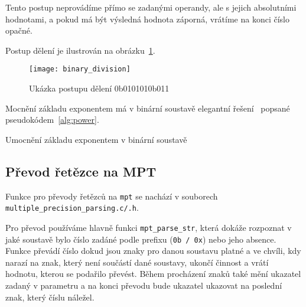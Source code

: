 Tento postup neprovádíme přímo se zadanými operandy, ale s jejich absolutními hodnotami, a pokud má být výsledná hodnota záporná, vrátíme na konci číslo opačné.

Postup dělení je ilustrován na obrázku~\ref{fig:binary_division}.

\begin{figure}[ht]
    \centering
    \texttt{[image: binary\_division]}
    \caption{Ukázka postupu dělení 0b010101\textdiv0b011}\label{fig:binary_division}
\end{figure}

Mocnění základu exponentem má v binární soustavě elegantní řešení~\cite{bib:power} popsané pseudokódem~\ref{alg:power}.

\begin{algorithm}[H]
\caption{Umocnění základu exponentem v binární soustavě}\label{alg:power}
\begin{algorithmic}[1]
\scriptsize{
	\EndIf{}
	\EndIf{}
        \EndIf{}
    \EndFor{}
\EndFunction{}
}
\end{algorithmic}
\end{algorithm}
\newpage

\subsection{Převod řetězce na MPT}
Funkce pro převody řetězců na \verb|mpt| se nachází v souborech \\ \verb|multiple_precision_parsing.c/.h|.

Pro převod používáme hlavně funkci \verb|mpt_parse_str|, která dokáže rozpoznat v jaké soustavě bylo číslo zadáné podle prefixu (\verb|0b / 0x|) nebo jeho absence. Funkce převádí číslo dokud jsou znaky pro danou soustavu platné a ve chvíli, kdy narazí na znak, který není součástí dané soustavy, ukončí činnost a vrátí hodnotu, kterou se podařilo převést. Během procházení znaků také mění ukazatel zadaný v parametru a na konci převodu bude ukazatel ukazovat na poslední znak, který číslu náležel.

